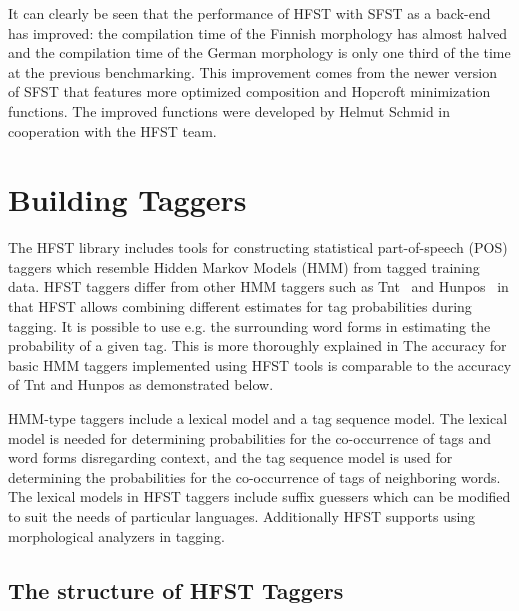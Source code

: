 \documentclass[draft]{llncs}
\begin{document}
It can clearly be seen that the performance of HFST with SFST as a back-end 
has improved: the compilation time of the Finnish morphology has almost
halved and the compilation time of the German morphology is only one third of the
time at the previous benchmarking. 
This improvement comes from the newer version of SFST that features more optimized
composition and Hopcroft minimization functions. The improved functions 
were developed by Helmut Schmid in cooperation with the HFST team.



\section{Building Taggers}\label{PosTools}



The HFST library includes tools for constructing statistical
part-of-speech (POS) taggers which resemble Hidden Markov Models (HMM) from
tagged training data. HFST taggers differ from other HMM taggers such
as Tnt~\cite{Brants:2000} and Hunpos~\cite{Halascy:2007} in that HFST
allows combining different estimates for tag probabilities during
tagging. It is possible to use e.g. the surrounding word forms in
estimating the probability of a given tag. This is more thoroughly
explained in \cite{silfverberg/2010/icetal,silfverberg/2011/nodalida} The
accuracy for basic HMM taggers implemented using HFST tools is
comparable to the accuracy of Tnt and Hunpos as demonstrated below.

HMM-type taggers include a lexical model and a tag sequence model. The
lexical model is needed for determining probabilities for the
co-occurrence of tags and word forms disregarding context, and the tag
sequence model is used for determining the probabilities for the
co-occurrence of tags of neighboring words. The lexical models in
HFST taggers include suffix guessers which can be modified to suit
the needs of particular languages. Additionally HFST supports using
morphological analyzers in tagging.

\subsection{The structure of HFST Taggers}
\end{document}
